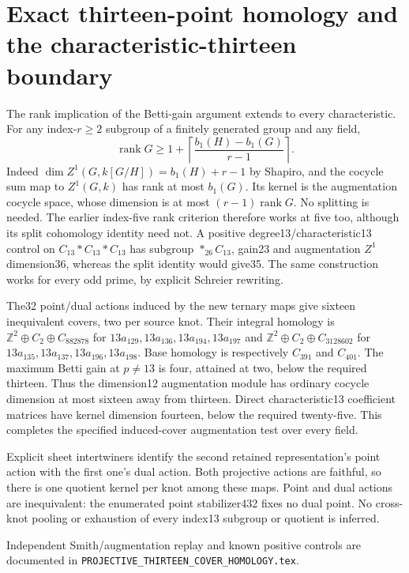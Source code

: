 \documentclass[11pt]{article}
\begin{document}
\section{Exact thirteen-point homology and the characteristic-thirteen boundary}

The rank implication of the Betti-gain argument extends to
every characteristic. For any index-$r\ge2$ subgroup of a
finitely generated group and any field,
\[
 \operatorname{rank}G\ge1+\left\lceil
       \frac{b_1(H)-b_1(G)}{r-1}\right\rceil.
\]
Indeed $\dim Z^1(G,k[G/H])=b_1(H)+r-1$ by Shapiro, and
the cocycle sum map to $Z^1(G,k)$ has rank at most $b_1(G)$.
Its kernel is the augmentation cocycle space, whose
dimension is at most $(r-1)\operatorname{rank}G$. No splitting is needed.
The earlier index-five rank criterion therefore works at
five too, although its split cohomology identity need not.
A positive degree13/characteristic13 control on
$C_{13}*C_{13}*C_{13}$ has subgroup $*_{26}C_{13}$,
gain23 and augmentation $Z^1$ dimension36, whereas the
split identity would give35. The same construction works
for every odd prime, by explicit Schreier rewriting.

The32 point/dual actions induced by the new ternary maps give
sixteen inequivalent covers, two per source knot. Their
integral homology is
$\mathbb Z^2\oplus C_2\oplus C_{882878}$ for
$13a_{129},13a_{136},13a_{194},13a_{197}$ and
$\mathbb Z^2\oplus C_2\oplus C_{3128602}$ for
$13a_{135},13a_{137},13a_{196},13a_{198}$.
Base homology is respectively $C_{391}$ and $C_{401}$.
The maximum Betti gain at $p\ne13$ is four, attained at two,
below the required thirteen. Thus the dimension12
augmentation module has ordinary cocycle dimension at most
sixteen away from thirteen. Direct characteristic13
coefficient matrices have kernel dimension fourteen, below
the required twenty-five. This completes the specified
induced-cover augmentation test over every field.

Explicit sheet intertwiners identify the second retained
representation's point action with the first one's dual
action. Both projective actions are faithful, so there is
one quotient kernel per knot among these maps. Point and
dual actions are inequivalent: the enumerated point
stabilizer432 fixes no dual point. No cross-knot pooling or
exhaustion of every index13 subgroup or quotient is inferred.

Independent Smith/augmentation replay and known positive
controls are documented in
\texttt{PROJECTIVE\_THIRTEEN\_COVER\_HOMOLOGY.tex}.
\end{document}
